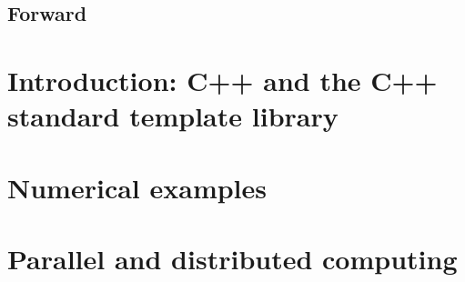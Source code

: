 \documentclass[11pt,fleqn]{book} %
\begin{document}
\tableofcontents %

\cleardoublepage %

\pagestyle{fancy} %

\chapter*{Forward}


\part{Introduction: C++ and the C++ standard template library}


%


%

\part{Numerical examples}
\label{part:numerical:examples}



\part{Parallel and distributed computing}
\end{document}
